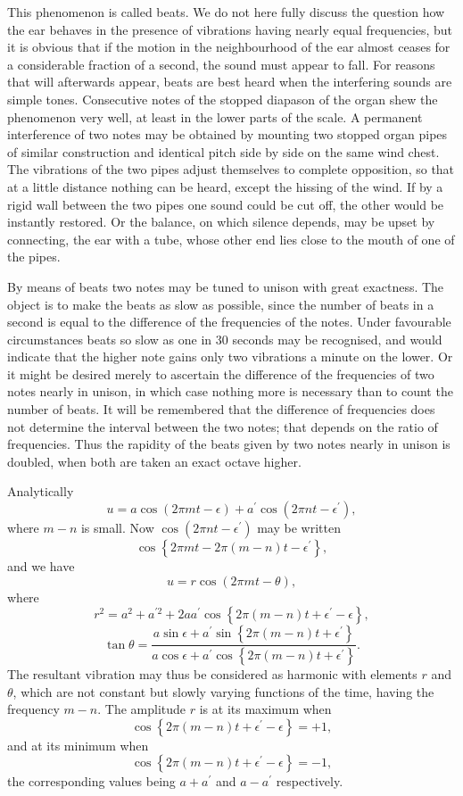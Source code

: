 This phenomenon is called beats. We do not here fully discuss the question how
the ear behaves in the presence of vibrations having nearly equal frequencies,
but it is obvious that if the motion in the neighbourhood of the ear almost
ceases for a considerable fraction of a second, the sound must appear to fall.
For reasons that will afterwards appear, beats are best heard when the
interfering sounds are simple tones. Consecutive notes of the stopped diapason
of the organ shew the phenomenon very well, at least in the lower parts of the
scale. A permanent interference of two notes may be obtained by mounting two
stopped organ pipes of similar construction and identical pitch side by side on
the same wind chest. The vibrations of the two pipes adjust themselves to
complete opposition, so that at a little distance nothing can be heard, except
the hissing of the wind. If by a rigid wall between the two pipes one sound
could be cut off, the other would be instantly restored. Or the balance, on
which silence depends, may be upset by connecting, the ear with a tube, whose
other end lies close to the mouth of one of the pipes.

By means of beats two notes may be tuned to unison with great exactness.  The
object is to make the beats as slow as possible, since the number of beats in a
second is equal to the difference of the frequencies of the notes. Under
favourable circumstances beats so slow as one in 30 seconds may be recognised,
and would indicate that the higher note gains only two vibrations a minute on
the lower. Or it might be desired merely to ascertain the difference of the
frequencies of two notes nearly in unison, in which case nothing more is
necessary than to count the number of beats. It will be remembered that the
difference of frequencies does not determine the interval between the two
notes; that depends on the ratio of frequencies. Thus the rapidity of the beats
given by two notes nearly in unison is doubled, when both are taken an exact
octave higher.

Analytically
\[u=a \cos (2 \pi m t-\epsilon)+a^{\prime} \cos \left(2 \pi n t-\epsilon^{\prime}\right),\]
where \(m-n\) is small. Now
\(\cos \left(2 \pi n t-\epsilon^{\prime}\right)\)
may be written
\[\cos \left\{2 \pi m t-2 \pi(m-n) t-\epsilon^{\prime}\right\},\]
and we have
\[u=r \cos (2 \pi m t-\theta) \tag{1}, \]
where
\[
r^2=a^2+a^{\prime 2}+2 a a^{\prime} \cos \left\{2 \pi(m-n)
t+\epsilon^{\prime}-\epsilon\right\} \tag{2},
\]
\[
\tan \theta=
\frac{a \sin \epsilon+a^{\prime} \sin \left\{2 \pi(m-n) t+\epsilon^{\prime}\right\}}
{a \cos \epsilon+a^{\prime} \cos \left\{2 \pi(m-n) t+\epsilon^{\prime}\right\}} \tag{3}.
\]
The resultant vibration may thus be considered as harmonic with
elements \(r\) and \(\theta\), which are not constant but slowly varying
functions of the time, having the frequency \(m-n\).  The amplitude \(r\) is at
its maximum when
\[\cos \left\{2 \pi(m-n)
t+\epsilon^{\prime}-\epsilon\right\}=+1,\]
and at its minimum when
\[\cos \left\{2 \pi(m-n) t+\epsilon^{\prime}-\epsilon\right\}=-1,\]
the corresponding
values being \(a+a^{\prime}\) and \(a-a^{\prime}\) respectively.

